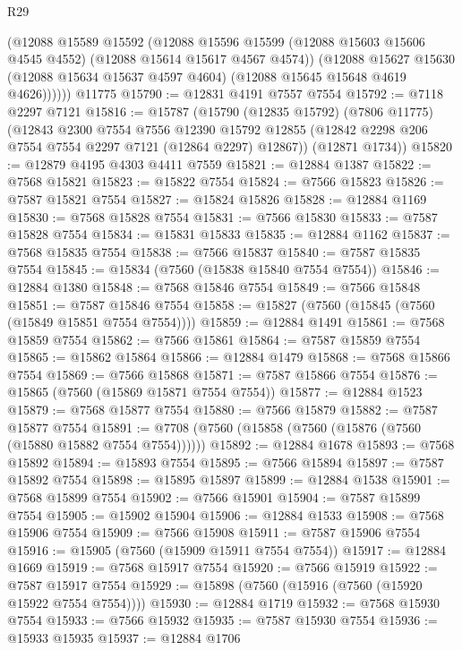 \begin{lexlean}{R29}
\begin{coremodule}
          (@12088
            @15589
            @15592
            (@12088
              @15596
              @15599
              (@12088 @15603 @15606 @4545 @4552)
              (@12088 @15614 @15617 @4567 @4574))
            (@12088
              @15627
              @15630
              (@12088 @15634 @15637 @4597 @4604)
              (@12088 @15645 @15648 @4619 @4626))))))
    @11775
@15790 := @12831 @4191 @7557 @7554
@15792 := @7118 @2297 @7121
@15816 := @15787
    (@15790
      (@12835 @15792)
      (@7806 @11775)
      (@12843
        @2300
        @7554
        @7556
        @12390
        @15792
        @12855
        (@12842 @2298 @206 @7554 @7554 @2297 @7121 (@12864 @2297) @12867))
      (@12871 @1734))
@15820 := @12879 @4195 @4303 @4411 @7559
@15821 := @12884 @1387
@15822 := @7568 @15821
@15823 := @15822 @7554
@15824 := @7566 @15823
@15826 := @7587 @15821 @7554
@15827 := @15824 @15826
@15828 := @12884 @1169
@15830 := @7568 @15828 @7554
@15831 := @7566 @15830
@15833 := @7587 @15828 @7554
@15834 := @15831 @15833
@15835 := @12884 @1162
@15837 := @7568 @15835 @7554
@15838 := @7566 @15837
@15840 := @7587 @15835 @7554
@15845 := @15834 (@7560 (@15838 @15840 @7554 @7554))
@15846 := @12884 @1380
@15848 := @7568 @15846 @7554
@15849 := @7566 @15848
@15851 := @7587 @15846 @7554
@15858 := @15827 (@7560 (@15845 (@7560 (@15849 @15851 @7554 @7554))))
@15859 := @12884 @1491
@15861 := @7568 @15859 @7554
@15862 := @7566 @15861
@15864 := @7587 @15859 @7554
@15865 := @15862 @15864
@15866 := @12884 @1479
@15868 := @7568 @15866 @7554
@15869 := @7566 @15868
@15871 := @7587 @15866 @7554
@15876 := @15865 (@7560 (@15869 @15871 @7554 @7554))
@15877 := @12884 @1523
@15879 := @7568 @15877 @7554
@15880 := @7566 @15879
@15882 := @7587 @15877 @7554
@15891 := @7708 (@7560 (@15858 (@7560 (@15876 (@7560 (@15880 @15882 @7554 @7554))))))
@15892 := @12884 @1678
@15893 := @7568 @15892
@15894 := @15893 @7554
@15895 := @7566 @15894
@15897 := @7587 @15892 @7554
@15898 := @15895 @15897
@15899 := @12884 @1538
@15901 := @7568 @15899 @7554
@15902 := @7566 @15901
@15904 := @7587 @15899 @7554
@15905 := @15902 @15904
@15906 := @12884 @1533
@15908 := @7568 @15906 @7554
@15909 := @7566 @15908
@15911 := @7587 @15906 @7554
@15916 := @15905 (@7560 (@15909 @15911 @7554 @7554))
@15917 := @12884 @1669
@15919 := @7568 @15917 @7554
@15920 := @7566 @15919
@15922 := @7587 @15917 @7554
@15929 := @15898 (@7560 (@15916 (@7560 (@15920 @15922 @7554 @7554))))
@15930 := @12884 @1719
@15932 := @7568 @15930 @7554
@15933 := @7566 @15932
@15935 := @7587 @15930 @7554
@15936 := @15933 @15935
@15937 := @12884 @1706

\end{coremodule}
\end{lexlean}
